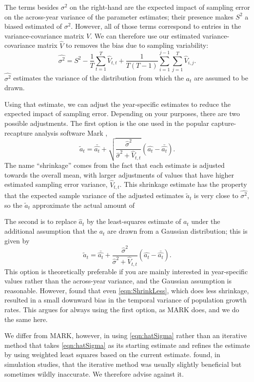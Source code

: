 \documentclass[11pt]{article}
\newcommand{\be}{\begin{equation}}
\newcommand{\ee}{\end{equation}}
\begin{document}
{The terms besides $\sigma^2$ on the right-hand are the expected impact of sampling error on the across-year variance
of the parameter estimates; their presence makes $S^2$ a biased estimated of $\sigma^2$. However,
all of those terms correspond to entries in the variance-covariance matrix $V$. We can therefore use our estimated
variance-covariance matrix $\hat{V}$ to removes the bias due to sampling variability: 
\be
\hat{\sigma^2}  = S^2 - \frac{1}{T}\sum\limits_{t=1}^T \hat{V}_{t,t} + 
\frac{1}{T(T-1)}\sum\limits_{i=1}^{j-1} \sum\limits_{j=1}^T \hat{V}_{i,j}. 
\label{eqn:hatSigma}
\ee
$\hat{\sigma^2}$ estimates the variance of the distribution from which the $a_t$ are assumed
to be drawn. 

Using that estimate, we can adjust the year-specific estimates to reduce the expected 
impact of sampling error. Depending on your purposes, there are two possible adjustments. 
The first option is the one used in the popular capture-recapture analysis 
software Mark \citet{cooch-white-2020}, 
\be
\widetilde{a}_t = \bar{\hat{a_t}} + \sqrt{\frac{\hat{\sigma}^2}{\hat{\sigma}^2 + \hat{V}_{t,t}}}\left (\hat{a_t} - \bar{\hat{a_t}} \right). 
\label{eqn:ShrinkLess}
\ee
The name ``shrinkage'' comes from the fact that each estimate is adjusted towards the overall mean, with 
larger adjustments of values that have higher estimated sampling error variance, $\hat{V}_{t,t}$. 
This shrinkage estimate has the property that the expected sample variance of the 
adjusted estimates $\widetilde{a}_t$ is very close to $\hat{\sigma^2}$, so the $\widetilde{a}_t$ approximate
the actual amount of 

The second is to replace $\hat{a}_t$ by the least-squares estimate of $a_t$ under the 
additional assumption that the $a_t$ are drawn from a Gaussian distribution; this is given by 
\be
\widetilde{a}_t = \bar{\hat{a_t}} + \frac{\hat{\sigma}^2}{\hat{\sigma}^2 + \hat{V}_{t,t}}\left (\hat{a_t} - \bar{\hat{a_t}} \right). 
\label{eqn:ShrinkMore}
\ee
This option is theoretically preferable if you are mainly interested in year-specific values rather than the across-year variance,
and the Gaussian assumption is reasonable. However, \citet{metcalf-etal-2015} found that even \eqref{eqn:ShrinkLess}, which does 
less shrinkage, resulted in a small downward bias in the temporal variance of population growth rates. This argues for  
always using the first option, as MARK does, and we do the same here. 

We differ from MARK, however, in using \eqref{eqn:hatSigma} rather than an iterative method that takes \eqref{eqn:hatSigma} as its 
starting estimate and refines the estimate by using weighted least squares based on the current estimate. 
\citet{metcalf-etal-2015} found, in simulation studies, that the iterative method was usually slightly beneficial but 
sometimes wildly inaccurate. We therefore advise against it. 

}
\end{document}
